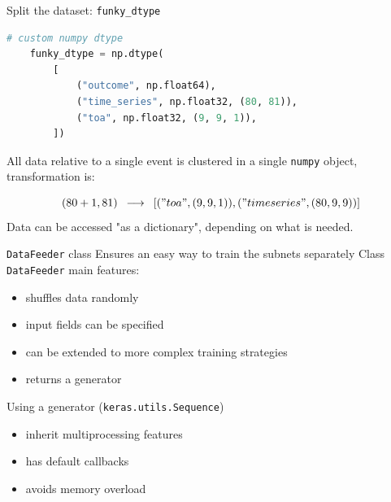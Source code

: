 \documentclass{beamer}
\begin{document}
\begin{frame}[fragile]{Split the dataset: \texttt{funky\_dtype}}

    
    \begin{lstlisting}[language=Python]
    # custom numpy dtype
    funky_dtype = np.dtype(
        [
            ("outcome", np.float64),
            ("time_series", np.float32, (80, 81)),
            ("toa", np.float32, (9, 9, 1)),
        ])
    \end{lstlisting}
    
    All data relative to a single event is clustered in a single \texttt{numpy} object, transformation is:
    
    \begin{equation*}
        (80 + 1, 81)\,\,\, \longrightarrow \,\,\, [("toa", (9, 9, 1)), ("timeseries", (80, 9,9))]
    \end{equation*}
    Data can be accessed "as a dictionary", depending on what is needed.

\end{frame}


\begin{frame}{\texttt{DataFeeder} class}
    Ensures an easy way to train the subnets separately %
    Class \texttt{DataFeeder} main features:
    \begin{itemize}
        \item[\textbullet] shuffles data randomly
        \item[\textbullet] input fields can be specified
        \item[\textbullet] can be extended to more complex training strategies
        \item[\textbullet] returns a generator
    \end{itemize}
    

\vspace{20 pt}
    Using a generator (\texttt{keras.utils.Sequence})
    \begin{itemize}
        \item[\textbullet] inherit multiprocessing features
        \item[\textbullet] has default callbacks
        \item[\textbullet] avoids memory overload
    \end{itemize}
    
\end{frame}
\end{document}
